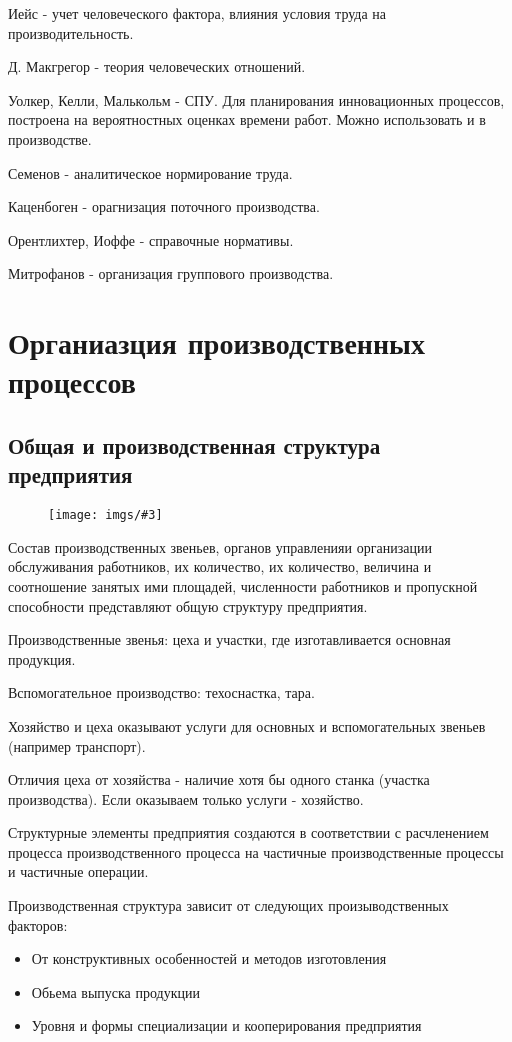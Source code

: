 \documentclass[14pt,a4paper,oneside]{extarticle}
\newcommand{\pic}[3]{
	\begin{figure}[#1]
		\begin{center}
			\texttt{[image: imgs/\#3]}
		\end{center}
	\end{figure}
}
\begin{document}
Иейс - учет человеческого фактора, влияния условия труда на производительность.

Д. Макгрегор - теория человеческих отношений.

Уолкер, Келли, Малькольм - СПУ. Для планирования инновационных процессов, построена на вероятностных оценках времени работ. Можно использовать и в производстве.

Семенов - аналитическое нормирование труда.

Каценбоген - орагнизация поточного производства.

Орентлихтер, Иоффе - справочные нормативы.

Митрофанов - организация группового производства.

\section{Органиазция производственных процессов}

\subsection{Общая и производственная структура предприятия}

\pic{H}{\textwidth}{1}

Состав производственных звеньев, органов управленияи организации обслуживания работников, их количество, их количество, величина и соотношение занятых ими площадей, численности работников и пропускной способности представляют общую структуру предприятия.

Производственные звенья: цеха и участки, где изготавливается основная продукция.

Вспомогательное производство: техоснастка, тара.

Хозяйство и цеха оказывают услуги для основных и вспомогательных звеньев (например транспорт).

Отличия цеха от хозяйства - наличие хотя бы одного станка (участка производства). Если оказываем только услуги - хозяйство.

Структурные элементы предприятия создаются в соответствии с расчленением процесса производственного процесса на частичные производственные процессы и частичные операции.

Производственная структура зависит от следующих произыводственных факторов:

\begin{itemize}
    \item От конструктивных особенностей и методов изготовления 
    \item Обьема выпуска продукции 
    \item Уровня и формы специализации и кооперирования предприятия
\end{itemize}
\end{document}

